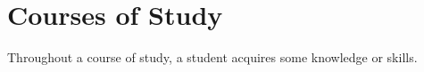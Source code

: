 
\section{Courses of Study}

Throughout a course of study, a student acquires some knowledge or skills.

